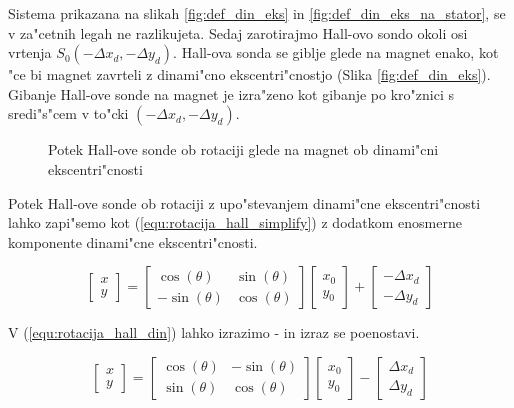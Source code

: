 Sistema prikazana na slikah \ref{fig:def_din_eks} in \ref{fig:def_din_eks_na_stator}, se v za"cetnih legah ne razlikujeta. Sedaj zarotirajmo Hall-ovo sondo okoli osi vrtenja $S_0(-\Delta x_d,-\Delta y_d)$. Hall-ova sonda se giblje glede na magnet enako, kot "ce bi magnet zavrteli z dinami"cno ekscentri"cnostjo (Slika \ref{fig:def_din_eks}). Gibanje Hall-ove sonde na magnet je izra"zeno kot gibanje po kro"znici s sredi"s"cem v to"cki $(-\Delta x_d,-\Delta y_d)$.

\begin{figure}[h!]
	\centering
	\caption{Potek Hall-ove sonde ob rotaciji glede na magnet ob dinami"cni ekscentri"cnosti}
	\label{fig:potek_sonde_din_eks}
\end{figure}

Potek Hall-ove sonde ob rotaciji z upo"stevanjem dinami"cne ekscentri"cnosti lahko zapi"semo kot (\ref{equ:rotacija_hall_simplify}) z dodatkom enosmerne komponente dinami"cne ekscentri"cnosti.

\begin{equation}
\label{equ:rotacija_hall_din}
\begin{bmatrix} x\\y \end{bmatrix}=
\begin{bmatrix} \cos(\theta)&\sin(\theta)\\-\sin(\theta)&\cos(\theta) \end{bmatrix}
\begin{bmatrix} x_0\\y_0 \end{bmatrix}
+
\begin{bmatrix} -\Delta x_d\\-\Delta y_d \end{bmatrix}
\end{equation}

V (\ref{equ:rotacija_hall_din}) lahko izrazimo - in izraz se poenostavi.

\begin{equation}
\label{equ:rotacija_hall_din_simplify}
\begin{bmatrix} x\\y \end{bmatrix}=
\begin{bmatrix} \cos(\theta)&-\sin(\theta)\\\sin(\theta)&\cos(\theta) \end{bmatrix}
\begin{bmatrix} x_0\\y_0 \end{bmatrix}
-
\begin{bmatrix} \Delta x_d\\\Delta y_d \end{bmatrix}
\end{equation}

